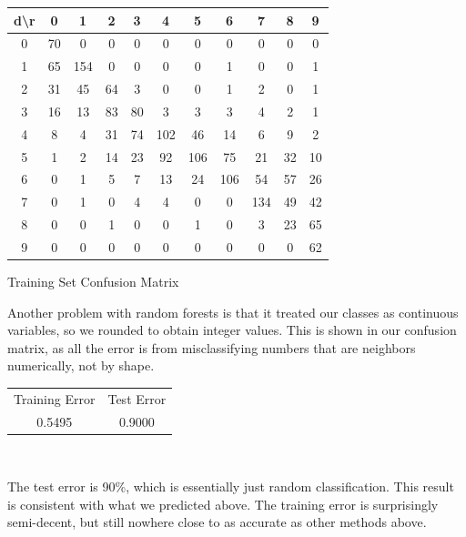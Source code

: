 \documentclass[10pt]{extarticle}
\begin{document}
\begin{minipage}{.55\textwidth}
\begin{center}
\begin{tabular}{c | c c c c c c c c c c}
	 d\textbackslash r&0& 1& 2& 3& 4& 5& 6& 7& 8& 9\\ \hline
	 0&70& 0& 0& 0& 0& 0& 0& 0& 0& 0\\
	 1&65 &154& 0& 0& 0& 0& 1& 0& 0& 1\\
	 2&31&45&64& 3& 0& 0& 1& 2& 0& 1\\
	 3&16&13&83&80& 3& 3& 3& 4& 2& 1\\
	 4& 8& 4&31&74 &102&46&14& 6& 9& 2\\
	 5& 1& 2&14&23&92& 106&75&21&32&10\\
	 6& 0& 1& 5& 7&13&24& 106&54&57&26\\
	 7& 0& 1& 0& 4& 4& 0& 0& 134&49&42\\
	 8& 0& 0& 1& 0& 0& 1& 0& 3&23&65\\
	 9& 0& 0& 0& 0& 0& 0& 0& 0& 0&62
\end{tabular}
\bigskip
Training Set Confusion Matrix
\end{center}
\end{minipage}
\begin{minipage}{.4\textwidth}
Another problem with random forests is that it treated our classes as continuous variables, so we rounded to obtain integer values. This is shown in our confusion matrix, as all the error is from misclassifying numbers that are neighbors numerically, not by shape.
\begin{center}
	\begin{tabular}{c c}
		Training Error & Test Error\\
		0.5495 & 0.9000
	\end{tabular}
\end{center}
\end{minipage}\\
\begin{minipage}{.45\textwidth}
	The test error is 90\%, which is essentially just random classification. This result is consistent with what we predicted above. The training error is surprisingly semi-decent, but still nowhere close to as accurate as other methods above.
\end{minipage}
\begin{minipage}{.05\textwidth}
	\quad
\end{minipage}
\end{document}
